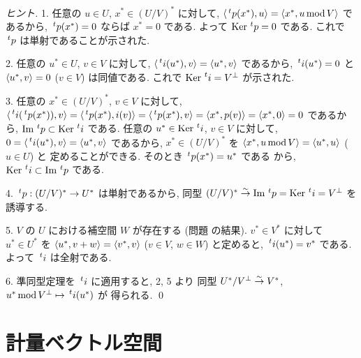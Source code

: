 \documentclass[12pt,twoside]{jarticle}
\begin{document}
\begin{proof}[ヒント]
  1. 任意の $u\in U$, $x^*\in (U/V)^*$ に対して, %
  $\bra\tp{p}(x^*),u\ket = \bra x^*,u\MOD V\ket$ であるから, %
  $\tp{p}(x^*)=0$ ならば $x^*=0$ である.
  よって $\Ker\tp{p}=0$ である.
  これで $\tp{p}$ は単射であることが示された.

  2. 任意の $u^*\in U$, $v\in V$ に対して, %
  $\bra \tp{i}(u^*),v\ket = \bra u^*,v\ket$ であるから, %
  $\tp{i}(u^*)=0$ と $\langle u^*,v\rangle=0$ ($v\in V$) は同値である.
  これで $\Ker\tp{i}=V^\bot$ が示された.

  3. 任意の $x^*\in(U/V)^*$, $v\in V$ に対して, %
  $\bra\tp{i}(\tp{p}(x^*)),v\ket 
  = \bra\tp{p}(x^*),i(v)\ket
  = \bra\tp{p}(x^*),v\ket
  = \bra x^*,p(v)\ket 
  = \bra x^*,0\ket 
  = 0$ であるから, $\Image\tp{p}\subset\Ker\tp{i}$ である.
  任意の $u^*\in\Ker\tp{i}$, $v\in V$ に対して, %
  $0 = \bra\tp{i}(u^*),v\ket
  = \bra u^*,v\ket$ であるから, $x^*\in(U/V)^*$ を %
  $\langle x^*,u\mathop{\mathrm{mod}}\nolimits V\rangle = \langle u^*,u\rangle$ ($u\in U$) と
  定めることができる. そのとき $\tp{p}(x^*)=u^*$ である
  から, $\Ker\tp{i}\subset\Image\tp{p}$ である.

  4. $\tp{p}:(U/V)^*\to U^*$ は単射であるから, 
  同型 $(U/V)^*\isomto\Image\tp{p}=\Ker\tp{i}=V^\bot$ を誘導する.

  5. $V$ の $U$ における補空間 $W$ が存在する
  (問題  の結果).
  $v^*\in V^*$ に対して $u^*\in U^*$ を $\langle u^*,v+w\rangle=\langle v^*,v\rangle$
  ($v\in V$, $w\in W$) と定めると, $\tp{i}(u^*)=v^*$ である.
  よって $\tp{i}$ は全射である.

  6. 準同型定理を $\tp{i}$ に適用すると, 2, 5 より
  同型 $U^*/V^\bot\overset\sim\rightarrow V^*$, $u^*\MOD V^\bot \mapsto \tp{i}(u^*)$ が
  得られる.
  \qed
\end{proof}


\section{計量ベクトル空間}
\label{sec:metric}
\end{document}
